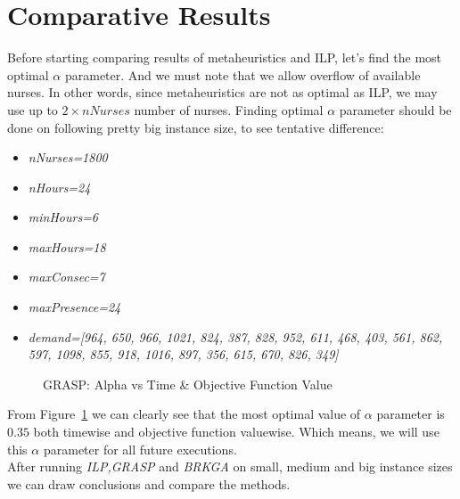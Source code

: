 \documentclass{article}
\newcommand\tab[1][1cm]{\hspace*{#1}}
\begin{document}
	\section{Comparative Results}
\tab Before starting comparing results of metaheuristics and ILP, let's find the most optimal $\alpha$ parameter. And we must note that we allow overflow of available nurses. In other words, since metaheuristics are not as optimal as ILP, we may use up to $2 \times nNurses$ number of nurses. Finding optimal $\alpha$ parameter should be done on following pretty big instance size, to see tentative difference:
\begin{itemize}
	\item \small \textit{nNurses=1800}
	\item \small \textit{nHours=24}
	\item \small \textit{minHours=6}
	\item \small \textit{maxHours=18}
	\item \small \textit{maxConsec=7}
	\item \small \textit{maxPresence=24}
	\item \small \textit{demand=[964, 650, 966, 1021, 824, 387, 828, 952, 611, 468, 403, 561, 862, 597, 1098, 855, 918, 1016, 897, 356, 615, 670, 826, 349]}
\end{itemize}

\begin{figure}[!htbp]
	\caption{GRASP: Alpha vs Time \& Objective Function Value}
	\label{fig:graspalpha}
\end{figure}
\tab From Figure~\ref{fig:graspalpha} we can clearly see that the most optimal value of $\alpha$ parameter is $0.35$ both timewise and objective function valuewise. Which means, we will use this $\alpha$ parameter for all future executions.\\
\tab After running \textit{ILP,GRASP} and \textit{BRKGA} on small, medium and big instance sizes we can draw conclusions and compare the methods.
\end{document}
